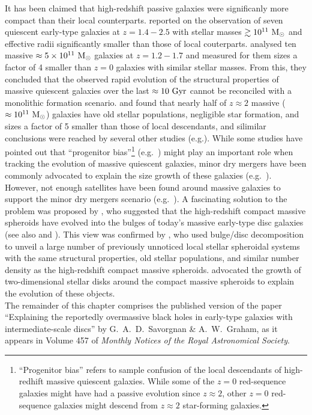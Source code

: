 It has been claimed that high-redshift passive galaxies were significanly more compact 
than their local counterparts. 
\citet{daddi2005} reported on the observation of seven quiescent early-type galaxies 
at $z=1.4-2.5$ with stellar masses $\gtrsim 10^{11} \rm~M_\odot$ 
and effective radii significantly smaller than those of local couterparts. 
\citet{trujillo2006} analysed ten massive $\approx 5 \times 10^{11} \rm~M_\odot$ galaxies at $z=1.2-1.7$ 
and measured for them sizes a factor of 4 smaller than $z=0$ galaxies with similar stellar masses. 
From this, they concluded that the observed rapid evolution of the structural properties of massive quiescent galaxies 
over the last $\approx 10 \rm~Gyr$ 
cannot be reconciled with a monolithic formation scenario. 
\citet{kriek2008} and \citet{vandokkum2008} found that nearly half of $z \approx 2$ 
massive ($\approx 10^{11} \rm~M_\odot$) galaxies 
have old stellar populations, negligible star formation, and sizes a factor of 5 smaller than 
those of local descendants, 
and silimilar conclusions were reached by several other studies 
(e.g.\citealt{toft2007,trujillo2007,zirm2007,buitrago2008,damjanov2009}). 
While some studies have pointed out that ``progenitor bias''\footnote{``Progenitor bias'' refers to sample confusion 
of the local descendants of high-redhift massive quiescent galaxies. 
While some of the $z=0$ red-sequence galaxies might have had a passive evolution since $z \approx 2$, 
other $z=0$ red-sequence galaxies might descend from $z \approx 2$ star-forming galaxies. } 
(e.g.~\citealt{carollo2014}) might play an important role 
when tracking the evolution of massive quiescent galaxies, 
minor dry mergers have been commonly advocated to explain the size growth of these galaxies 
(e.g.~\citealt{hopkins2009,carrasco2010,cimatti2012,fan2013,de2014}).
However, not enough satellites have been found around massive galaxies 
to support the minor dry mergers scenario 
(e.g.~\citealt{khochfarburkert2006,maller2006,hopkins2009,naab2009,mclure2013}). 
A fascinating solution to the problem was proposed by \citet{graham2013review}, 
who suggested that the high-redshift compact massive spheroids have evolved into the bulges 
of today's massive early-type disc galaxies (see also \citealt{dullograham2013cores} and \citealt{driver2013}). 
This view was confirmed by \citet{gds2015}, 
who used bulge/disc decomposition 
to unveil a large number of previously unnoticed local stellar spheroidal systems 
with the same structural properties, old stellar populations, 
and similar number density as the high-redshift compact massive spheroids. 
\citet{gds2015} advocated the growth of two-dimensional stellar disks around the compact massive spheroids 
to explain the evolution of these objects. \\

The remainder of this chapter comprises the published version of the paper 
``Explaining the reportedly overmassive black holes in early-type galaxies with intermediate-scale discs'' 
by G.~A.~D.~Savorgnan \& A.~W.~Graham,  
as it appears in Volume 457 of \emph{Monthly Notices of the Royal Astronomical Society}. 


